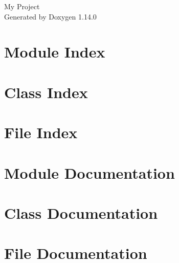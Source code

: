\documentclass[twoside]{book}
\newcommand{\+}{\discretionary{\mbox{\scriptsize$\hookleftarrow$}}{}{}}
\newcommand{\clearemptydoublepage}{%
    \newpage{\pagestyle{empty}\cleardoublepage}%
  }
\begin{document}
  \raggedbottom
    \hypersetup{pageanchor=false,
                bookmarksnumbered=true,
                pdfencoding=unicode
               }
  \begin{titlepage}
  \vspace*{7cm}
  \begin{center}%
  {\Large My Project}\\
  \vspace*{1cm}
  {\large Generated by Doxygen 1.14.0}\\
  \end{center}
  \end{titlepage}
  \clearemptydoublepage
  \tableofcontents
  \clearemptydoublepage
  \hypersetup{pageanchor=true}

\chapter{Module Index}

\chapter{Class Index}

\chapter{File Index}

\chapter{Module Documentation}

\chapter{Class Documentation}



\chapter{File Documentation}























  \backmatter
  \newpage
  \clearemptydoublepage
  \printindex
\end{document}

